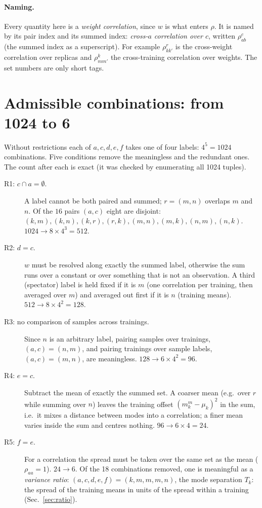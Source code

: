 \documentclass[11pt]{article}
\begin{document}
\paragraph{Naming.} Every quantity here is a \emph{weight correlation}, since $w$ is what enters $\rho$. It is named
by its pair index and its summed index: \emph{cross-$a$ correlation over $c$}, written $\rho^{c}_{ab}$ (the
summed index as a superscript). For example $\rho^{r}_{kk'}$ is the cross-weight correlation over replicas and
$\rho^{k}_{mm'}$ the cross-training correlation over weights. The set numbers are only short tags.

\section{Admissible combinations: from 1024 to 6}
Without restrictions each of $a, c, d, e, f$ takes one of four labels: $4^5 = 1024$ combinations. Five
conditions remove the meaningless and the redundant ones. The count after each is exact (it was checked
by enumerating all 1024 tuples).

\begin{description}
\item[R1: $c \cap a = \emptyset$.] A label cannot be both paired and summed; $r = (m,n)$ overlaps $m$ and $n$.
  Of the $16$ pairs $(a,c)$ eight are disjoint: $(k,m), (k,n), (k,r), (r,k), (m,n), (m,k), (n,m), (n,k)$.
  $1024 \to 8 \times 4^3 = 512$.
\item[R2: $d = c$.] $w$ must be resolved along exactly the summed label, otherwise the sum runs over a constant
  or over something that is not an observation. A third (spectator) label is held fixed if it is $m$
  (one correlation per training, then averaged over $m$) and averaged out first if it is $n$ (training means).
  $512 \to 8 \times 4^2 = 128$.
\item[R3: no comparison of samples across trainings.] Since $n$ is an arbitrary label, pairing samples over
  trainings, $(a,c)=(n,m)$, and pairing trainings over sample labels, $(a,c)=(m,n)$, are meaningless.
  $128 \to 6 \times 4^2 = 96$.
\item[R4: $e = c$.] Subtract the mean of exactly the summed set. A coarser mean (e.g.\ over $r$ while summing over
  $n$) leaves the training offset $(m_k^{m}-\mu_k)^2$ in the sum, i.e.\ it mixes a distance between modes
  into a correlation; a finer mean varies inside the sum and centres nothing. $96 \to 6 \times 4 = 24$.
\item[R5: $f = e$.] For a correlation the spread must be taken over the same set as the mean ($\rho_{aa}=1$).
  $24 \to 6$. Of the 18 combinations removed, one is meaningful as a \emph{variance ratio}:
  $(a,c,d,e,f) = (k,m,m,m,n)$, the mode separation $T_k$: the spread of the training means in units of the spread within a training
  (Sec.~\ref{sec:ratio}).
\end{description}
\end{document}
